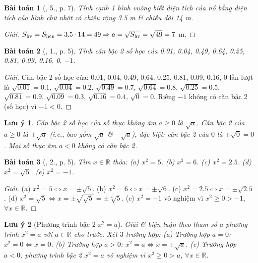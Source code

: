 \documentclass{article}
\newtheorem{baitoan}{Bài toán}
\newtheorem{luuy}{Lưu ý}
\begin{document}
\begin{baitoan}[\cite{SGK_Toan_9_tap_1}, 5., p. 7]
	Tính cạnh 1 hình vuông biết diện tích của nó bằng diện tích của hình chữ nhật có chiều rộng \emph{3.5 m} \& chiều dài \emph{14 m}.
\end{baitoan}

\begin{proof}[Giải]
	$S_{\rm hv} = S_{\rm hcn} = 3.5\cdot14 = 49\Rightarrow a = \sqrt{S_{\rm hv}} = \sqrt{49} = 7$ m.
\end{proof}

\begin{baitoan}[\cite{SBT_Toan_9_tap_1}, 1., p. 5]
	Tính căn bậc 2 số học của \emph{0.01, 0.04, 0.49, 0.64, 0.25, 0.81, 0.09, 0.16, 0, $-1$.}
\end{baitoan}

\begin{proof}[Giải]
	Căn bậc 2 số học của: 0.01, 0.04, 0.49, 0.64, 0.25, 0.81, 0.09, 0.16, 0 lần lượt là $\sqrt{0.01} = 0.1$, $\sqrt{0.04} = 0.2$, $\sqrt{0.49} = 0.7$, $\sqrt{0.64} = 0.8$, $\sqrt{0.25} = 0.5$, $\sqrt{0.81} = 0.9$, $\sqrt{0.09} = 0.3$, $\sqrt{0.16} = 0.4$, $\sqrt{0} = 0$. Riêng $-1$ không có căn bậc 2 (số học) vì $-1 < 0$.
\end{proof}

\begin{luuy}
	Căn bậc 2 số học của số thực không âm $a\ge0$ là $\sqrt{a}$. Căn bậc 2 của $a\ge0$ là $\pm\sqrt{a}$ (i.e., bao gồm $\sqrt{a}$ \& $-\sqrt{a}$), đặc biệt: căn bậc 2 của $0$ là $\pm\sqrt{0} = 0$. Mọi số thực âm $a < 0$ không có căn bậc 2. 
\end{luuy}

\begin{baitoan}[\cite{SBT_Toan_9_tap_1}, 2., p. 5]
	Tìm $x\in\mathbb{R}$ thỏa: (a) $x^2 = 5$. (b) $x^2 = 6$. (c) $x^2 = 2.5$. (d) $x^2 = \sqrt{5}$. (e) $x^2 = -1$.
\end{baitoan}

\begin{proof}[Giải]
	(a) $x^2 = 5\Leftrightarrow x = \pm\sqrt{5}$. (b) $x^2 = 6\Leftrightarrow x = \pm\sqrt{6}$. (c) $x^2 = 2.5\Leftrightarrow x = \pm\sqrt{2.5}$. (d) $x^2 = \sqrt{5}\Leftrightarrow x = \pm\sqrt{\sqrt{5}} = \pm\sqrt[4]{5}$. (e) $x^2 = -1$ vô nghiệm vì $x^2\ge0 > -1$, $\forall x\in\mathbb{R}$.
\end{proof}

\begin{luuy}[Phương trình bậc 2 $x^2 = a$]
	Giải \& biện luận theo tham số $a$ phương trình $x^2 = a$ với $a\in\mathbb{R}$ cho trước. Xét $3$ trường hợp: (a) Trường hợp $a = 0$: $x^2 = 0\Leftrightarrow x = 0$. (b) Trường hợp $a > 0$: $x^2 = a\Leftrightarrow x = \pm\sqrt{a}$. (c) Trường hợp $a < 0$: phương trình bậc 2 $x^2 = a$ vô nghiệm vì $x^2\ge0 > a$, $\forall x\in\mathbb{R}$.
\end{luuy}
\end{document}
